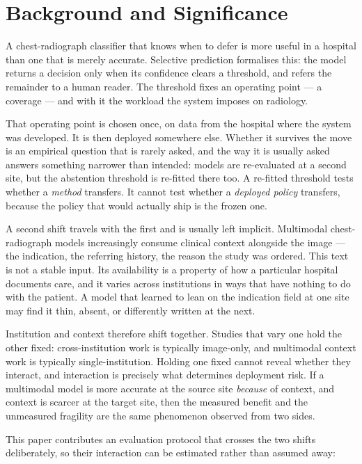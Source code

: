 \section{Background and Significance}
\label{sec:background}

A chest-radiograph classifier that knows when to defer is more useful in a
hospital than one that is merely accurate. Selective prediction formalises
this: the model returns a decision only when its confidence clears a threshold,
and refers the remainder to a human reader. The threshold fixes an operating
point --- a coverage --- and with it the workload the system imposes on
radiology.

That operating point is chosen once, on data from the hospital where the system
was developed. It is then deployed somewhere else. Whether it survives the move
is an empirical question that is rarely asked, and the way it is usually asked
answers something narrower than intended: models are re-evaluated at a second
site, but the abstention threshold is re-fitted there too. A re-fitted threshold
tests whether a \emph{method} transfers. It cannot test whether a \emph{deployed
policy} transfers, because the policy that would actually ship is the frozen
one.

A second shift travels with the first and is usually left implicit. Multimodal
chest-radiograph models increasingly consume clinical context alongside the
image --- the indication, the referring history, the reason the study was
ordered. This text is not a stable input. Its availability is a property of how
a particular hospital documents care, and it varies across institutions in ways
that have nothing to do with the patient. A model that learned to lean on the
indication field at one site may find it thin, absent, or differently written at
the next.

Institution and context therefore shift together. Studies that vary one hold the
other fixed: cross-institution work is typically image-only, and multimodal
context work is typically single-institution. Holding one fixed cannot reveal
whether they interact, and interaction is precisely what determines deployment
risk. If a multimodal model is more accurate at the source site \emph{because}
of context, and context is scarcer at the target site, then the measured benefit
and the unmeasured fragility are the same phenomenon observed from two sides.

This paper contributes an evaluation protocol that crosses the two shifts
deliberately, so their interaction can be estimated rather than assumed away:

